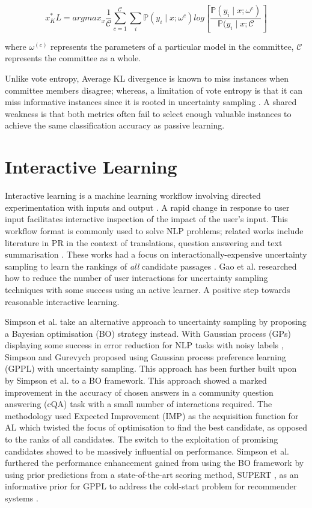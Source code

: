 \documentclass[ %
                    author={James Stephenson},
                supervisor={Dr. Edwin Simpson},
                    degree={MSc},
                     title={PROJECT PLAN},
                  subtitle={ Bayesian Deep Learning For Extractive Test Summarisation},
                      type={},
                      year={2022}]{../additions/dissertation}
\begin{document}
				$$
					x^\ast_KL = argmax_x \frac{1}{\mathcal{C}} \sum_{c=1}^{\mathcal{C}} \sum_i \mathbb{P}(y_i \mid x; \omega^{c}) log \left[\frac{\mathbb{P}(y_i \mid x; \omega^{c})}{\mathbb{P}(y_i \mid x; \mathcal{C}}\right]
				$$

				\noindent
				where $\omega^{(c)}$ represents the parameters of a particular model in the committee, $\mathcal{C}$ represents the committee as a whole.

				\medbreak
				Unlike vote entropy, Average KL divergence is known to miss instances when committee members disagree; whereas, a limitation of vote entropy is that it can miss informative instances since it is rooted in uncertainty sampling \cite{Li06}. A shared weakness is that both metrics often fail to select enough valuable instances to achieve the same classification accuracy as passive learning.
		
		\section{Interactive Learning}
		\label{chap:literaturereview:interactive}
		
			Interactive learning is a machine learning workflow involving directed experimentation with inputs and output \cite{Amershi14}. A rapid change in response to user input facilitates interactive inspection of the impact of the user’s input.  This workflow format is commonly used to solve NLP problems; related works include literature in PR in the context of translations, question answering and text summarisation \cite{Peris18, Lin17, PVS17}. These works had a focus on interactionally-expensive uncertainty sampling to learn the rankings of \emph{all} candidate passages \cite{Simpson19}. Gao et al. \cite{Gao18} researched how to reduce the number of user interactions for uncertainty sampling techniques with some success using an active learner. A positive step towards reasonable interactive learning.

			\medbreak
			Simpson et al. \cite{Simpson19} take an alternative approach to uncertainty sampling by proposing a Bayesian optimisation (BO) strategy instead. With Gaussian process (GPs) displaying some success in error reduction for NLP tasks with noisy labels \cite{Cohn13, Beck14}, Simpson and Gurevych \cite{Simpson18} proposed using Gaussian process preference learning (GPPL) with uncertainty sampling. This approach has been further built upon by Simpson et al. \cite{Simpson19} to a BO framework. This approach showed a marked improvement in the accuracy of chosen answers in a community question answering (cQA) task with a small number of interactions required. The methodology used Expected Improvement (IMP) as the acquisition function for AL which twisted the focus of optimisation to find the best candidate, as opposed to the ranks of all candidates. The switch to the exploitation of promising candidates showed to be massively influential on performance. Simpson et al. \cite{Simpson19} furthered the performance enhancement gained from using the BO framework by using prior predictions from a state-of-the-art scoring method, SUPERT \cite{Gao20}, as an informative prior for GPPL to address the cold-start problem for recommender systems \cite{Bobadilla12}.
		
\end{document}
